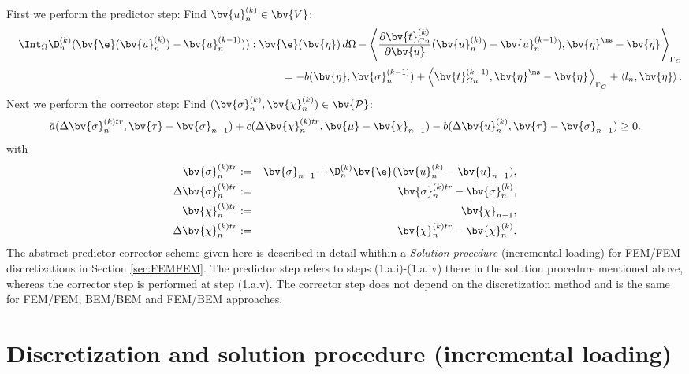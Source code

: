 First we perform the predictor step:
Find $\bv{u}^{(k)}_{n} \in\bv{V}$:
\begin{eqnarray}
&&\Int_{\Omega}\D^{(k)}_{n}(\bv{\e}(\bv{u}^{(k)}_{n})-\bv{u}^{(k-1)}_{n})):\bv{\e}(\bv{\eta})\, d\Omega - \left\langle \frac{\partial\bv{t}^{(k)}_{Cn}}{\partial \bv{u}}(\bv{u}^{(k)}_{n})-\bv{u}^{(k-1)}_{n}), \bv{\eta}^{\ms}-\bv{\eta}^{\sl} \right\rangle_{\Gamma_C}   \nonumber \\ &&=-b(\bv{\eta},\bv{\sigma}^{(k-1)}_{n})+\left\langle \bv{t}^{(k-1)}_{Cn}, \bv{\eta}^{\ms}-\bv{\eta}^{\sl} \right\rangle_{\Gamma_C}+\left\langle l_{n},\bv{\eta}\right\rangle.
\end{eqnarray}
Next we perform the corrector step: 
Find $(\bv{\sigma}^{(k)}_{n},\bv{\chi}^{(k)}_{n})\in\bv{\mathcal{P}}$:
\begin{equation}
 \bar{a}(\Delta \bv{\sigma}^{(k)tr}_{ {n}},\bv{\tau}-\bv{\sigma}_{n-1})+c(\Delta \bv{\chi}^{(k)tr}_{n},\bv{\mu}-\bv{\chi}_{n-1})-b(\Delta \bv{u}^{(k)}_{n},\bv{\tau}-\bv{\sigma}_{n-1})\geq 0.
\end{equation}
with
\begin{eqnarray}
 \bv{\sigma}^{(k)tr}_{n}&:=&\bv{\sigma}_{n-1}+\D^{(k)}_{n}\bv{\e}(\bv{u}^{(k)}_{n}-\bv{u}_{n-1}), \\
 \Delta \bv{\sigma}^{(k)tr}_{n}&:=&\bv{\sigma}^{(k)tr}_{n}-\bv{\sigma}^{(k)}_{n}, \\
 \bv{\chi}^{(k)tr}_{n}&:=&\bv{\chi}_{n-1}, \\
 \Delta \bv{\chi}^{(k)tr}_{n}&:=&\bv{\chi}^{(k)tr}_{n}-\bv{\chi}^{(k)}_{n}.
\end{eqnarray}
The abstract predictor-corrector scheme given here is described in detail whithin a \textit{Solution procedure} (incremental loading)  for FEM/FEM discretizations in Section \ref{sec:FEMFEM}. The predictor step refers to steps (1.a.i)-(1.a.iv) there in the solution procedure mentioned above, whereas the corrector step is performed at step (1.a.v). The corrector step does not depend on the discretization method and is the same for FEM/FEM, BEM/BEM and FEM/BEM approaches.
\newpage
\section{Discretization and solution procedure (incremental loading)}\label{sec:ElPlContact:DiscretizationSolutionProcedure}

